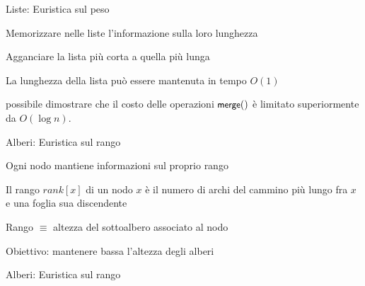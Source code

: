 \begin{frame}{Liste: Euristica sul peso}

\vspace{-9pt}
\begin{myboxtitle}
\BIL
\item Memorizzare nelle liste l’informazione sulla loro lunghezza
\item Agganciare la lista più corta a quella più lunga
\item La lunghezza della lista può essere mantenuta in tempo $O(1)$
\EIL 
\end{myboxtitle}

\begin{myboxtitle}[Complessità]
\BIL
\item \EE possibile dimostrare che il costo delle operazioni $\textsf{{\small merge}}()$ è limitato superiormente da $O(\log n)$.
\EIL
\end{myboxtitle}
\end{frame}

\begin{frame}{Alberi: Euristica sul rango}

\vspace{-9pt}
\begin{myboxtitle}
\BIL
\item Ogni nodo mantiene informazioni sul proprio rango
\item Il rango $\mathit{rank}[x]$ di un nodo $x$ è il numero di archi 
del cammino più lungo fra $x$ e una foglia sua discendente
\item Rango $\equiv$ altezza del sottoalbero associato al nodo
\item Obiettivo: mantenere bassa l'altezza degli alberi
\EIL 
\end{myboxtitle}

\end{frame}

\begin{frame}{Alberi: Euristica sul rango}

\vspace{-15pt}

\end{frame}

